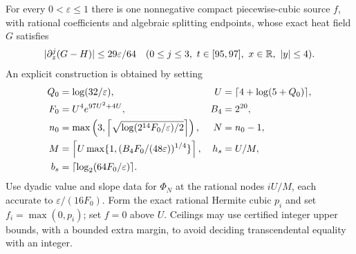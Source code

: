 \begin{proposition}\label{prop:fi-source}
For every $0<\varepsilon\le1$ there is one nonnegative compact
piecewise-cubic source $f$, with rational coefficients and algebraic
splitting endpoints, whose exact heat field $G$ satisfies
\begin{equation}
 |\partial_z^j(G-H)|\le29\varepsilon/64
 \quad(0\le j\le3,\ t\in[95,97],\ x\in\mathbb R,\ |y|\le4).
 \label{eq:fi-source-error}
\end{equation}
An explicit construction is obtained by setting
\begin{align}
 Q_0&=\log(32/\varepsilon),&U&=\lceil4+\log(5+Q_0)\rceil,\notag\\
 F_0&=U^4e^{97U^2+4U},&B_4&=2^{20},\notag\\
 n_0&=\max\left(3,\left\lceil\sqrt{\log(2^{14}F_0/\varepsilon)/2}\right\rceil\right),
 &N&=n_0-1,\notag\\
 M&=\left\lceil U\max\{1,(B_4F_0/(48\varepsilon))^{1/4}\}\right\rceil,
 &h_s&=U/M,\notag\\
 b_s&=\lceil\log_2(64F_0/\varepsilon)\rceil.
 \label{eq:fi-recipe}
\end{align}
Use dyadic value and slope data for $\Phi_N$ at the rational nodes
$iU/M$, each accurate to $\varepsilon/(16F_0)$. Form the exact rational
Hermite cubic $p_i$ and set $f_i=\max(0,p_i)$; set $f=0$ above $U$.
Ceilings may use certified integer upper bounds, with a bounded extra
margin, to avoid deciding transcendental equality with an integer.
\end{proposition}
